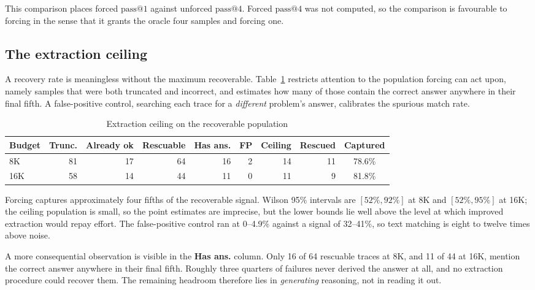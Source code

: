 \documentclass[12pt,a4paper,oneside]{report}
\begin{document}
This comparison places forced $\text{pass}@1$ against unforced
$\text{pass}@4$. Forced $\text{pass}@4$ was not computed, so the comparison is
favourable to forcing in the sense that it grants the oracle four samples and
forcing one.

\subsection{The extraction ceiling}

A recovery rate is meaningless without the maximum recoverable.
Table~\ref{tab:ceiling} restricts attention to the population forcing can act
upon, namely samples that were both truncated and incorrect, and estimates how
many of those contain the correct answer anywhere in their final fifth. A
false-positive control, searching each trace for a \emph{different} problem's
answer, calibrates the spurious match rate.

\begin{table}[htbp]
\centering
\caption{Extraction ceiling on the recoverable population}
\label{tab:ceiling}
\small
\begin{tabular}{@{}lrrrrrrrc@{}}
\toprule
\textbf{Budget} & \textbf{Trunc.} & \textbf{Already ok} & \textbf{Rescuable} &
\textbf{Has ans.} & \textbf{FP} & \textbf{Ceiling} & \textbf{Rescued} &
\textbf{Captured} \\
\midrule
8K  & 81 & 17 & 64 & 16 & 2 & 14 & 11 & 78.6\% \\
16K & 58 & 14 & 44 & 11 & 0 & 11 &  9 & 81.8\% \\
\bottomrule
\end{tabular}
\end{table}

Forcing captures approximately four fifths of the recoverable signal. Wilson
95\% intervals are $[52\%,92\%]$ at 8K and $[52\%,95\%]$ at 16K; the ceiling
population is small, so the point estimates are imprecise, but the lower bounds
lie well above the level at which improved extraction would repay effort. The
false-positive control ran at 0--4.9\% against a signal of 32--41\%, so text
matching is eight to twelve times above noise.

A more consequential observation is visible in the \textbf{Has ans.} column.
Only 16 of 64 rescuable traces at 8K, and 11 of 44 at 16K, mention the correct
answer anywhere in their final fifth. Roughly three quarters of failures never
derived the answer at all, and no extraction procedure could recover them. The
remaining headroom therefore lies in \emph{generating} reasoning, not in reading
it out.
\end{document}
